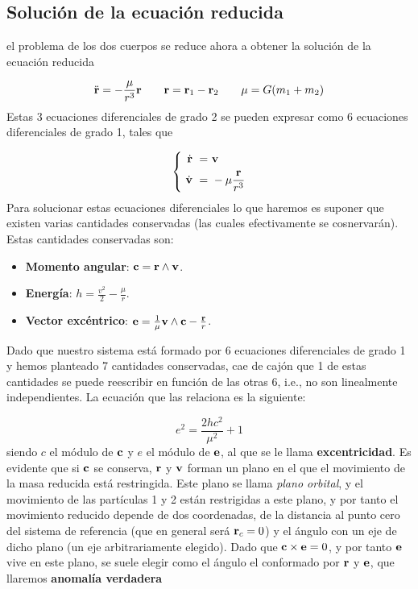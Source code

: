 \subsection{Solución de la ecuación reducida}

el problema de los dos cuerpos se reduce ahora a obtener la solución de la ecuación reducida 

\begin{equation*}
    \ddot{\mathbf{r}} = - \frac{\mu}{r^3} \mathbf{r} \qquad \mathbf{r}=\mathbf{r}_1-\mathbf{r}_2 \qquad \mu=G(m_1+m_2)
\end{equation*}
Estas 3 ecuaciones diferenciales de grado 2 se pueden expresar como 6 ecuaciones diferenciales de grado 1, tales que

\begin{equation}
    \left\lbrace \ 
    \begin{split}
        \dot{\rn} \ = \ & \vn \\
        \dot{\vn} \ = \ & - \mu \frac{\rn}{r^3}
    \end{split}
    \right.
\end{equation}
Para solucionar estas ecuaciones diferenciales lo que haremos es suponer que existen varias cantidades conservadas (las cuales efectivamente se cosnervarán). Estas cantidades conservadas son:

\begin{itemize}
    \item \textbf{Momento angular}: $\mathbf{c}=\mathbf{r}\wedge\mathbf{v}$.
    \item \textbf{Energía}: $h=\frac{v^2}{2}-\frac{\mu}{r}$.
    \item \textbf{Vector excéntrico}: $\mathbf{e}=\frac{1}{\mu} \mathbf{v} \wedge \mathbf{c} - \frac{\mathbf{r}}{r}$.
\end{itemize}
Dado que nuestro sistema está formado por 6 ecuaciones diferenciales de grado 1 y hemos planteado 7 cantidades conservadas, cae de cajón que 1 de estas cantidades se puede reescribir en función de las otras 6, i.e., no son linealmente independientes. La ecuación que las relaciona es la siguiente:

\begin{equation}
    e^2 = \frac{2hc^2}{\mu^2} + 1
\end{equation}
siendo $c$ el módulo de $\mathbf{c}$ y $e$ el módulo de $\mathbf{e}$, al que se le llama \textbf{excentricidad}. Es evidente que si $\mathbf{c}$ se conserva, $\mathbf{r}$ y $\mathbf{v}$ forman un plano en el que el movimiento de la masa reducida está restringida. Este plano se llama \textit{plano orbital}, y el movimiento de las partículas 1 y 2 están restrigidas a este plano, y por tanto el movimiento reducido depende de dos coordenadas, de la distancia al punto cero del sistema de referencia (que en general será $\mathbf{r}_c=0$) y el ángulo con un eje de dicho plano (un eje arbitrariamente elegido). Dado que $\mathbf{c} \times \mathbf{e} = 0$, y por tanto $\mathbf{e}$ vive en este plano, se suele elegir como el ángulo el conformado por $\mathbf{r}$ y $\mathbf{e}$, que llaremos \textbf{anomalía verdadera}

